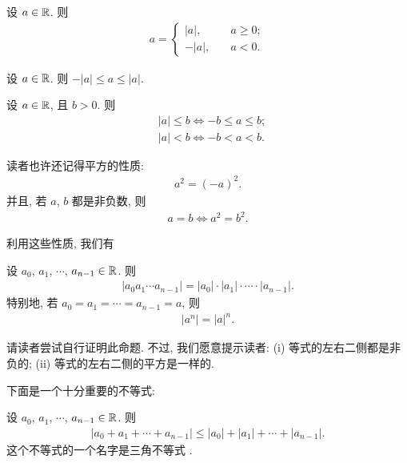 \begin{proposition}
    设 $a \in \mathbb{R}$. 则
    \begin{align*}
        a = \begin{cases}
            |a|,  & \quad a \geq 0; \\
            -|a|, & \quad a < 0.
        \end{cases}
    \end{align*}
\end{proposition}

\begin{proposition}
    设 $a \in \mathbb{R}$. 则 $-|a| \leq a \leq |a|$.
\end{proposition}

\begin{proposition}
    设 $a \in \mathbb{R}$, 且 $b > 0$. 则
    \begin{align*}
         & |a| \leq b \iff -b \leq a \leq b; \\
         & |a| < b \iff -b < a < b.
    \end{align*}
\end{proposition}

读者也许还记得平方的性质:
\begin{align*}
    a^2 = (-a)^2.
\end{align*}
并且, 若 $a$, $b$ 都是非负数, 则
\begin{align*}
    a = b \iff a^2 = b^2.
\end{align*}

利用这些性质, 我们有

\begin{proposition}
    设 $a_0$, $a_1$, $\cdots$, $a_{n-1} \in \mathbb{R}$. 则
    \begin{align*}
        |a_0 a_1 \cdots a_{n-1}| = |a_0| \cdot |a_1| \cdot \cdots \cdot |a_{n-1}|.
    \end{align*}
    特别地, 若 $a_0 = a_1 = \cdots = a_{n-1} = a$, 则
    \begin{align*}
        |a^n| = |a|^n.
    \end{align*}
\end{proposition}

\begin{pf}
    请读者尝试自行证明此命题. 不过, 我们愿意提示读者: (i) 等式的左右二侧都是非负的; (ii) 等式的左右二侧的平方是一样的.
\end{pf}

下面是一个十分重要的不等式:

\begin{proposition}
    设 $a_0$, $a_1$, $\cdots$, $a_{n-1} \in \mathbb{R}$. 则
    \begin{align*}
        |a_0 + a_1 + \cdots + a_{n-1}| \leq |a_0| + |a_1| + \cdots + |a_{n-1}|.
    \end{align*}
    这个不等式的一个名字是三角不等式 .
\end{proposition}

